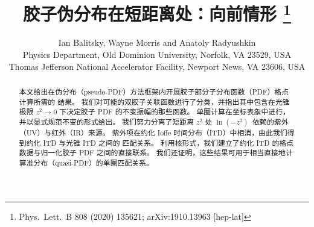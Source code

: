 \documentclass[11pt]{ctexart}
\title{胶子伪分布在短距离处：向前情形%
\thanks{Phys.\ Lett.\ B 808 (2020) 135621; arXiv:1910.13963 [hep-lat]}}
\author{Ian Balitsky, Wayne Morris and Anatoly Radyushkin\\[8pt]
\normalsize Physics Department, Old Dominion University, Norfolk, VA 23529, USA\\[3pt]
\normalsize Thomas Jefferson National Accelerator Facility, Newport News, VA 23606, USA}
\date{}
\begin{document}
\maketitle

\begin{abstract}
本文给出在伪分布（pseudo-PDF）方法框架内开展胶子部分子分布函数（PDF）格点计算所需的
结果。
我们对可能的双胶子关联函数进行了分类，并指出其中包含在光锥极限 $z^2 \to 0$ 下决定胶子
PDF 的不变振幅的那些函数。
单圈计算在坐标表象中进行，并以显式规范不变的形式给出。
我们努力分离了短距离 $z^2$ 处 \mbox{$\ln (-z^2)$ 依赖}的紫外（UV）与红外（IR）来源。
紫外项在约化 Ioffe 时间分布（ITD）中相消，由此我们得到约化 ITD 与光锥 ITD 之间的
匹配关系。
利用核形式，我们建立了约化 ITD 的格点数据与归一化胶子 PDF 之间的直接联系。
我们还证明，这些结果可用于相当直接地计算准分布（quasi-PDF）的单圈匹配关系。
\end{abstract}










\end{document}
